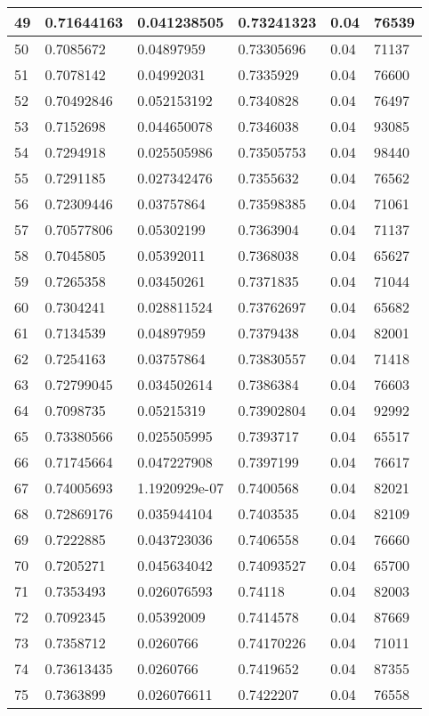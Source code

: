 \begin{longtable}{|l|l|l|l|l|l|}
49 & 0.71644163 & 0.041238505 & 0.73241323 & 0.04 & 76539 \\ \hline 
50 & 0.7085672 & 0.04897959 & 0.73305696 & 0.04 & 71137 \\ \hline 
51 & 0.7078142 & 0.04992031 & 0.7335929 & 0.04 & 76600 \\ \hline 
52 & 0.70492846 & 0.052153192 & 0.7340828 & 0.04 & 76497 \\ \hline 
53 & 0.7152698 & 0.044650078 & 0.7346038 & 0.04 & 93085 \\ \hline 
54 & 0.7294918 & 0.025505986 & 0.73505753 & 0.04 & 98440 \\ \hline 
55 & 0.7291185 & 0.027342476 & 0.7355632 & 0.04 & 76562 \\ \hline 
56 & 0.72309446 & 0.03757864 & 0.73598385 & 0.04 & 71061 \\ \hline 
57 & 0.70577806 & 0.05302199 & 0.7363904 & 0.04 & 71137 \\ \hline 
58 & 0.7045805 & 0.05392011 & 0.7368038 & 0.04 & 65627 \\ \hline 
59 & 0.7265358 & 0.03450261 & 0.7371835 & 0.04 & 71044 \\ \hline 
60 & 0.7304241 & 0.028811524 & 0.73762697 & 0.04 & 65682 \\ \hline 
61 & 0.7134539 & 0.04897959 & 0.7379438 & 0.04 & 82001 \\ \hline 
62 & 0.7254163 & 0.03757864 & 0.73830557 & 0.04 & 71418 \\ \hline 
63 & 0.72799045 & 0.034502614 & 0.7386384 & 0.04 & 76603 \\ \hline 
64 & 0.7098735 & 0.05215319 & 0.73902804 & 0.04 & 92992 \\ \hline 
65 & 0.73380566 & 0.025505995 & 0.7393717 & 0.04 & 65517 \\ \hline 
66 & 0.71745664 & 0.047227908 & 0.7397199 & 0.04 & 76617 \\ \hline 
67 & 0.74005693 & 1.1920929e-07 & 0.7400568 & 0.04 & 82021 \\ \hline 
68 & 0.72869176 & 0.035944104 & 0.7403535 & 0.04 & 82109 \\ \hline 
69 & 0.7222885 & 0.043723036 & 0.7406558 & 0.04 & 76660 \\ \hline 
70 & 0.7205271 & 0.045634042 & 0.74093527 & 0.04 & 65700 \\ \hline 
71 & 0.7353493 & 0.026076593 & 0.74118 & 0.04 & 82003 \\ \hline 
72 & 0.7092345 & 0.05392009 & 0.7414578 & 0.04 & 87669 \\ \hline 
73 & 0.7358712 & 0.0260766 & 0.74170226 & 0.04 & 71011 \\ \hline 
74 & 0.73613435 & 0.0260766 & 0.7419652 & 0.04 & 87355 \\ \hline 
75 & 0.7363899 & 0.026076611 & 0.7422207 & 0.04 & 76558 \\ \hline 
\end{longtable}